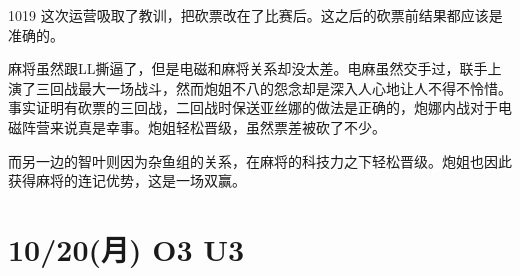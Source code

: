 
1019 这次运营吸取了教训，把砍票改在了比赛后。这之后的砍票前结果都应该是准确的。

麻将虽然跟LL撕逼了，但是电磁和麻将关系却没太差。电麻虽然交手过，联手上演了三回战最大一场战斗，然而炮姐不八的怨念却是深入人心地让人不得不怜惜。事实证明有砍票的三回战，二回战时保送亚丝娜的做法是正确的，炮娜内战对于电磁阵营来说真是幸事。炮姐轻松晋级，虽然票差被砍了不少。

而另一边的智叶则因为杂鱼组的关系，在麻将的科技力之下轻松晋级。炮姐也因此获得麻将的连记优势，这是一场双赢。

\section{10/20(月) O3 U3}

